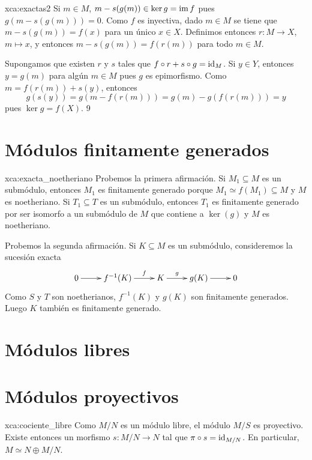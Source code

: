 \begin{sol}{xca:exactas2}	
	Si $m\in M$, $m-s(g(m))\in\ker g=\operatorname{im} f$ pues
	$g(m-s(g(m)))=0$. Como $f$ es inyectiva, dado $m\in M$ se tiene que 
	$m-s(g(m))=f(x)$ para un único $x\in X$. Definimos entonces
	$r\colon M\to X$, $m\mapsto x$, y entonces
	$m-s(g(m))=f(r(m))$ para todo $m\in M$.

	Supongamos que existen $r$ y $s$ tales que $f\circ r+s\circ g=\operatorname{id}_M$. Si $y\in Y$, entonces $y=g(m)$ 
	para algún $m\in M$ pues $g$ es epimorfismo. Como $m=f(r(m))+s(y)$, entonces
	\[
	g(s(y))=g(m-f(r(m)))=g(m)-g(f(r(m)))=y
	\]
	pues $\ker g=f(X)$. 
	9 
\end{sol}

\section*{Módulos finitamente generados}

\begin{sol}{xca:exacta_noetheriano}
	Probemos la primera afirmación. Si $M_1\subseteq M$ es un submódulo, entonces
	$M_1$ es finitamente generado porque $M_1\simeq f(M_1)\subseteq M$ y $M$ es
	noetheriano. Si $T_1\subseteq T$ es un submódulo, entonces $T_1$ es
	finitamente generado por ser isomorfo a un submódulo de $M$ que
	contiene a $\ker(g)$ y $M$ es noetheriano.

	Probemos la segunda afirmación. Si $K\subseteq M$ es un submódulo,
	consideremos la sucesión exacta
	\[
		\xymatrix{
		0\ar[r] 
		& f^{-1}(K)
		\ar[r]^-{f}
		& K
		\ar[r]^-{g}
		& g(K)\ar[r]
		& 0
		}
	\]
	Como $S$ y $T$ son noetherianos, $f^{-1}(K)$ y $g(K)$ son finitamente
	generados. Luego $K$ también es finitamente
	generado.
\end{sol}

\section*{Módulos libres}

\section*{Módulos proyectivos}

\begin{sol}{xca:cociente_libre}
Como $M/N$ es un módulo libre, el módulo $M/S$ es proyectivo. Existe entonces un morfismo $s\colon M/N\to N$ tal 
que $\pi\circ s=\operatorname{id}_{M/N}$. En particular, $M\simeq N\oplus M/N$. 	
\end{sol}

